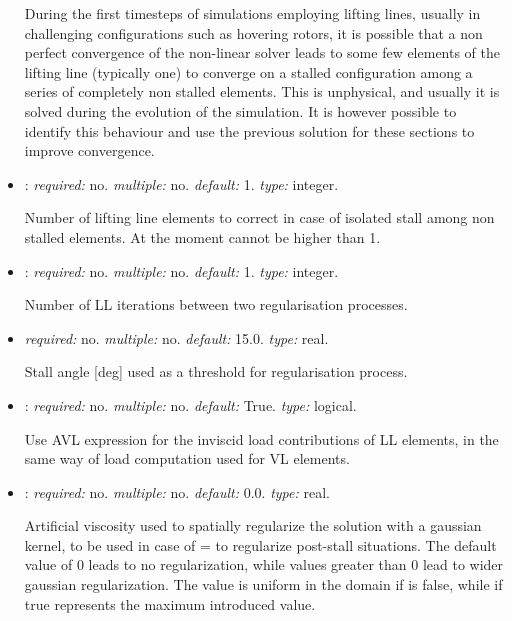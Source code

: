 \begin{itemize}
During the first timesteps of simulations employing lifting lines, 
usually in challenging configurations such as hovering rotors, 
it is possible that a non perfect convergence of the non-linear 
solver leads to some few elements of the lifting line (typically one) 
to converge on a stalled configuration among a series of completely 
non stalled elements. This is unphysical, and usually it is solved 
during the evolution of the simulation. It is however possible to 
identify this behaviour and use the previous solution for these 
sections to improve convergence. 

\item {}: \textit{required:} no. 
\textit{multiple:} no. \textit{default:} 1. \textit{type:} integer.

Number of lifting line elements to correct in case of isolated 
stall among non stalled elements. At the moment cannot be higher than 1.

\item {}: \textit{required:} no. 
\textit{multiple:} no. \textit{default:} 1. \textit{type:} integer.

Number of LL iterations between two regularisation processes.

\item {} \textit{required:} no. 
\textit{multiple:} no. \textit{default:} 15.0. \textit{type:} real.

Stall angle [deg] used as a threshold for regularisation process. 

\item {}: \textit{required:} no. \textit{multiple:} no. 
\textit{default:} True. \textit{type:} logical.

Use AVL expression for the inviscid load contributions of LL elements, 
in the same way of load computation used for VL elements.

\item {}: \textit{required:} no. 
\textit{multiple:} no. \textit{default:} 0.0. \textit{type:} real.

Artificial viscosity used to spatially regularize the solution with 
a gaussian kernel, to be used in case of  =  
to regularize post-stall situations. The default value of 0 leads to no 
regularization, while values greater than 0 lead to wider gaussian regularization. 
The value is uniform in the domain if  is 
false, while if true represents the maximum introduced value.


\end{itemize}
